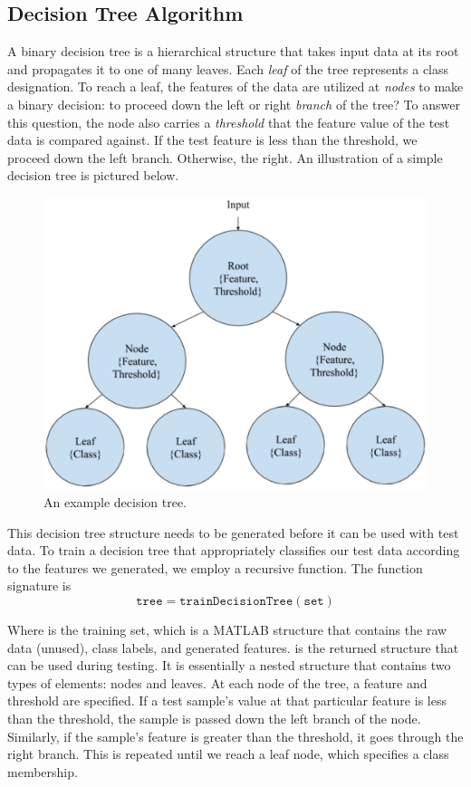 \subsection{Decision Tree Algorithm}

A binary decision tree is a hierarchical structure that takes input data at its root and propagates it to one of many leaves. Each \emph{leaf} of the tree represents a class designation. To reach a leaf, the features of the data are utilized at \emph{nodes} to make a binary decision: to proceed down the left or right \emph{branch} of the tree? To answer this question, the node also carries a \emph{threshold} that the feature value of the test data is compared against. If the test feature is less than the threshold, we proceed down the left branch. Otherwise, the right. An illustration of a simple decision tree is pictured below.
%
\begin{figure}[H]
  \centering\includegraphics[width=0.5\columnwidth]{../images/decision_tree}
  \caption{An example decision tree.}
\end{figure}

This decision tree structure needs to be generated before it can be used with test data. To train a decision tree that appropriately classifies our test data according to the features we generated, we employ a recursive function. The function signature is
%
\begin{equation*}
  \mathtt{tree = trainDecisionTree(set)}
\end{equation*}

Where  is the training set, which is a MATLAB structure that contains the raw data (unused), class labels, and generated features.  is the returned structure that can be used during testing. It is essentially a nested structure that contains two types of elements: nodes and leaves. At each node of the tree, a feature and threshold are specified. If a test sample's value at that particular feature is less than the threshold, the sample is passed down the left branch of the node. Similarly, if the sample's feature is greater than the threshold, it goes through the right branch. This is repeated until we reach a leaf node, which specifies a class membership. 

